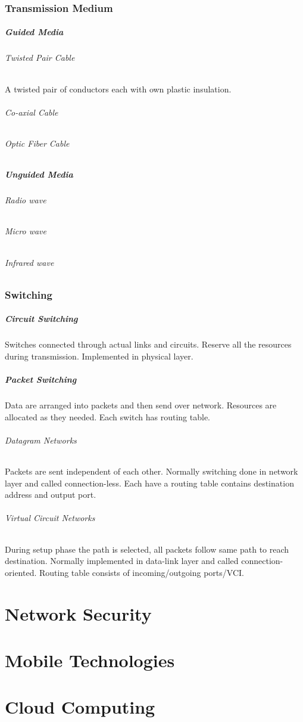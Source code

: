 \subsection{Transmission Medium}
\paragraph{Guided Media}
\subparagraph{Twisted Pair Cable} A twisted pair of conductors each with own plastic insulation.
\subparagraph{Co-axial Cable}  
\subparagraph{Optic Fiber Cable}
\paragraph{Unguided Media}
\subparagraph{Radio wave}
\subparagraph{Micro wave}
\subparagraph{Infrared wave}
\subsection{Switching}
\paragraph{Circuit Switching} Switches connected through actual links and circuits. Reserve all the resources during transmission. Implemented in physical layer.
\paragraph{Packet Switching} Data are arranged into packets and then send over network. Resources are allocated as they needed. Each switch has routing table.
\subparagraph{Datagram Networks} Packets are sent independent of each other. Normally switching done in network layer and called connection-less. Each have a routing table contains destination address and output port.
\subparagraph{Virtual Circuit Networks} During setup phase the path is selected, all packets follow same path to reach destination. Normally implemented in data-link layer and called connection-oriented. Routing table consists of incoming/outgoing ports/VCI.
\chapter{Network Security}
\chapter{Mobile Technologies}
\chapter{Cloud Computing}
